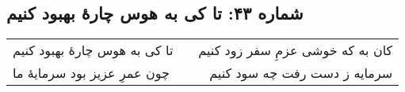 \begin{center}
\section*{شماره ۴۳: تا کی به هوس چارۀ بهبود کنیم}
\label{sec:043}
\begin{longtable}{l p{0.5cm} r}
تا کی به هوس چارهٔ بهبود کنیم
&&
کان به که خوشی عزمِ سفر زود کنیم
\\
چون عمرِ عزیز بود سرمایهٔ ما
&&
سرمایه ز دست رفت چه سود کنیم
\\
\end{longtable}
\end{center}
